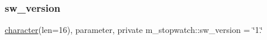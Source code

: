 \mbox{\label{namespacem__stopwatch_af92219c7ffaec61677d2eeb5004e598c}} 
\subsubsection{\texorpdfstring{sw\+\_\+version}{sw\_version}}
{\footnotesize\ttfamily \hyperlink{option__stopwatch_83_8txt_abd4b21fbbd175834027b5224bfe97e66}{character}(len=16), parameter, private m\+\_\+stopwatch\+::sw\+\_\+version = \char`\"{}1.\char`\"{}\hspace{0.3cm}{\ttfamily [private]}}


